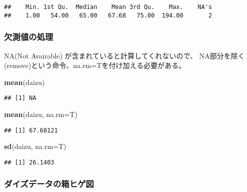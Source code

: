 \documentclass[]{article}
\newenvironment{Shaded}{\begin{snugshade}}{\end{snugshade}}
\newcommand{\DataTypeTok}[1]{\textcolor[rgb]{0.13,0.29,0.53}{#1}}
\newcommand{\KeywordTok}[1]{\textcolor[rgb]{0.13,0.29,0.53}{\textbf{#1}}}
\newcommand{\NormalTok}[1]{#1}
\begin{document}
\begin{verbatim}
##    Min. 1st Qu.  Median    Mean 3rd Qu.    Max.    NA's 
##    1.00   54.00   65.00   67.68   75.00  194.00       2
\end{verbatim}

\hypertarget{ux6b20ux6e2cux5024ux306eux51e6ux7406}{%
\subsubsection{欠測値の処理}\label{ux6b20ux6e2cux5024ux306eux51e6ux7406}}

NA(Not Avairable) が含まれていると計算してくれないので、
NA部分を除く(remove)という命令、na.rm=Tを付け加える必要がある。

\begin{Shaded}
\begin{Highlighting}[]
    \KeywordTok{mean}\NormalTok{(daizu)}
\end{Highlighting}
\end{Shaded}

\begin{verbatim}
## [1] NA
\end{verbatim}

\begin{Shaded}
\begin{Highlighting}[]
    \KeywordTok{mean}\NormalTok{(daizu, }\DataTypeTok{na.rm=}\NormalTok{T)}
\end{Highlighting}
\end{Shaded}

\begin{verbatim}
## [1] 67.68121
\end{verbatim}

\begin{Shaded}
\begin{Highlighting}[]
    \KeywordTok{sd}\NormalTok{(daizu, }\DataTypeTok{na.rm=}\NormalTok{T)}
\end{Highlighting}
\end{Shaded}

\begin{verbatim}
## [1] 26.1403
\end{verbatim}

\hypertarget{ux30c0ux30a4ux30baux30c7ux30fcux30bfux306eux7bb1ux30d2ux30b2ux56f3}{%
\subsubsection{ダイズデータの箱ヒゲ図}\label{ux30c0ux30a4ux30baux30c7ux30fcux30bfux306eux7bb1ux30d2ux30b2ux56f3}}
\end{document}
